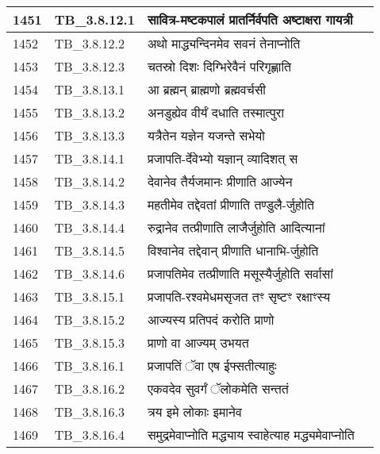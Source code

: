 \documentclass[17pt]{extarticle}
\begin{document}
\begin{longtable}{||p{0.4in}||p{0.9in}||p{4.0in}||p{0.9in}||}
        \hline
            1451 & TB\_3.8.12.1 & सावित्र{-}मष्टकपालं प्रातर्निर्वपति अष्टाक्षरा गायत्री &      \\
        \hline
            1452 & TB\_3.8.12.2 & अथो माद्ध्यन्दिनमेव सवनं तेनाप्नोति &      \\
        \hline
            1453 & TB\_3.8.12.3 & चतस्रो दिशः दिग्भिरेवैनं परिगृह्णाति &      \\
        \hline
            1454 & TB\_3.8.13.1 & आ ब्रह्मन् ब्राह्मणो ब्रह्मवर्चसी &      \\
        \hline
            1455 & TB\_3.8.13.2 & अनडुह्येव वीर्यं दधाति तस्मात्पुरा &      \\
        \hline
            1456 & TB\_3.8.13.3 & यत्रैतेन यज्ञेन यजन्ते सभेयो &      \\
        \hline
            1457 & TB\_3.8.14.1 & प्रजापति{-}र्देवेभ्यो यज्ञान् व्यादिशत् स &      \\
        \hline
            1458 & TB\_3.8.14.2 & देवानेव तैर्यजमानः प्रीणाति आज्येन &      \\
        \hline
            1459 & TB\_3.8.14.3 & महतीमेव तद्देवतां प्रीणाति तण्डुलै{-}र्जुहोति &      \\
        \hline
            1460 & TB\_3.8.14.4 & रुद्रानेव तत्प्रीणाति लाजैर्जुहोति आदित्यानां &      \\
        \hline
            1461 & TB\_3.8.14.5 & विश्वानेव तद्देवान् प्रीणाति धानाभि{-}र्जुहोति &      \\
        \hline
            1462 & TB\_3.8.14.6 & प्रजापतिमेव तत्प्रीणाति मसूस्यैर्जुहोति सर्वासां &      \\
        \hline
            1463 & TB\_3.8.15.1 & प्रजापति{-}रश्वमेधमसृजत तꣳ सृष्टꣳ रक्षाꣳस्य &      \\
        \hline
            1464 & TB\_3.8.15.2 & आज्यस्य प्रतिपदं करोति प्राणो &      \\
        \hline
            1465 & TB\_3.8.15.3 & प्राणो वा आज्यम् उभयत &      \\
        \hline
            1466 & TB\_3.8.16.1 & प्रजापतिं ॅवा एष ईफ्सतीत्याहुः &      \\
        \hline
            1467 & TB\_3.8.16.2 & एकवदेव सुवर्गं ॅलोकमेति सन्ततं &      \\
        \hline
            1468 & TB\_3.8.16.3 & त्रय इमे लोकाः इमानेव &      \\
        \hline
            1469 & TB\_3.8.16.4 & समुद्रमेवाप्नोति मद्ध्याय स्वाहेत्याह मद्ध्यमेवाप्नोति &      \\

\end{longtable}
\end{document}

